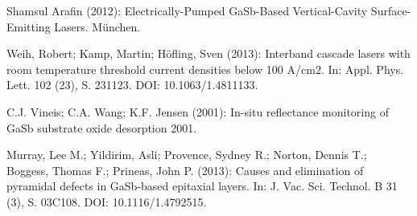 \documentclass[paper=a4,fontsize=10pt,DIV=18,twocolumn,parskip=half]{scrartcl}
\numberwithin{equation}{section}    %
\begin{document}
\begin{thebibliography}{}   

 Shamsul Arafin (2012): Electrically-Pumped GaSb-Based 
Vertical-Cavity Surface-Emitting Lasers. München.

 Weih, Robert; Kamp, Martin; Höfling, Sven (2013): Interband 
cascade lasers with room temperature threshold current densities below 100 
A/cm2. In: Appl. Phys. Lett. 102 (23), S. 231123. DOI: 10.1063/1.4811133.

 C.J. Vineis; C.A. Wang; K.F. Jensen (2001): In-situ reflectance 
monitoring of GaSb substrate oxide desorption 2001.

 Murray, Lee M.; Yildirim, Asli; Provence, Sydney R.; Norton, 
Dennis T.; Boggess, Thomas F.; Prineas, John P. (2013): Causes and elimination 
of pyramidal defects in GaSb-based epitaxial layers. In: J. Vac. Sci. Technol. B 
31 (3), S. 03C108. DOI: 10.1116/1.4792515.
  

\end{thebibliography}
%
%
\onecolumn
\pagestyle{empty}
\end{document}
